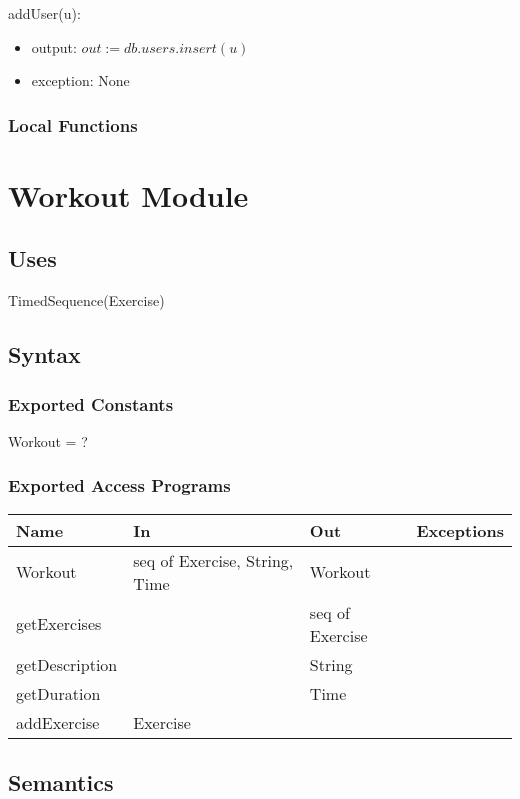 \documentclass[12pt, titlepage]{article}
\begin{document}
addUser(u):
\begin{itemize}
	\item output: $out := db.users.insert(u)$
	\item exception: None
\end{itemize}



\subsubsection{Local Functions}


\newpage

\section{Workout Module}

\subsection{Uses}
TimedSequence(Exercise)
\subsection{Syntax}

\subsubsection{Exported Constants}
Workout = ?
\subsubsection{Exported Access Programs}

\begin{center}
	\begin{tabular}{p{2cm} p{4cm} p{4cm} p{2cm}}
		\hline
		\textbf{Name} & \textbf{In} & \textbf{Out} & \textbf{Exceptions} \\
		\hline
		Workout & seq of Exercise, String, Time & Workout &  \\
		getExercises &  & seq of Exercise &  \\
		getDescription &  & String &  \\
		getDuration &  & Time &  \\
		addExercise & Exercise & &  \\
		\hline
	\end{tabular}
\end{center}

\subsection{Semantics}
\end{document}

